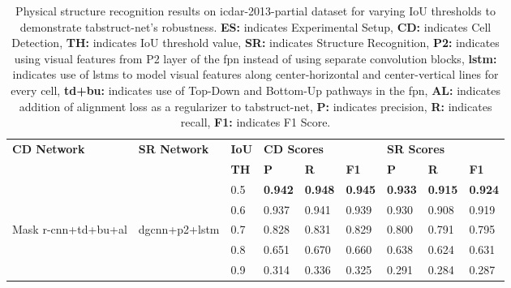 \documentclass[runningheads]{llncs}
\begin{document}
\begin{table}
\addtolength{\tabcolsep}{-1.0pt}
\begin{center}
\begin{tabular}{|l |l| l| l l l| l l l|} \hline
\textbf{CD Network} & \textbf{SR Network} &\textbf{IoU} &\multicolumn{3}{l|}{\textbf{CD Scores}} &\multicolumn{3}{l|}{\textbf{SR Scores}} \\ \cline{4-9}
 &  &\textbf{TH} &\textbf{P} &\textbf{R} &\textbf{F1} &\textbf{P} &\textbf{R} &\textbf{F1} \\ \hline
 &  &0.5	&\textbf{0.942}	&\textbf{0.948} &\textbf{0.945} &\textbf{0.933} &\textbf{0.915} &\textbf{0.924} \\  
 &      &0.6 &0.937	&0.941 &0.939 &0.930 &0.908	&0.919 \\
Mask {\sc r-cnn}+{\sc td}+{\sc bu}+{\sc al} &{\sc dgcnn}+{\sc p}2+{\sc lstm}  &0.7 &0.828 &0.831 &0.829 &0.800 &0.791 &0.795  \\
 &      &0.8 &0.651	&0.670 &0.660 &0.638 &0.624	&0.631 \\
 &      &0.9 &0.314	&0.336 &0.325 &0.291 &0.284	&0.287 \\ \hline
 \end{tabular}
\end{center}
\caption{Physical structure recognition results on {\sc icdar}-2013-partial dataset for varying IoU thresholds to demonstrate {\sc t}ab{\sc s}truct-{\sc n}et's robustness. \textbf{ES:} indicates Experimental Setup, \textbf{CD:} indicates Cell Detection, \textbf{TH:} indicates IoU threshold value, \textbf{SR:} indicates Structure Recognition, \textbf{P2:} indicates using visual features from P2 layer of the {\sc fpn} instead of using separate convolution blocks, \textbf{{\sc lstm}:} indicates use of {\sc lstm}s to model visual features along center-horizontal and center-vertical lines for every cell, \textbf{{\sc td}+{\sc bu}:} indicates use of Top-Down and Bottom-Up pathways in the {\sc fpn}, \textbf{AL:} indicates addition of alignment loss as a regularizer to {\sc t}ab{\sc s}truct-{\sc n}et, \textbf{P:} indicates precision, \textbf{R:} indicates recall, \textbf{F1:} indicates F1 Score. \label{table_varying_ious_physical_icdar_2013-partial}}
\vspace{-1em}
\end{table}
\end{document}
